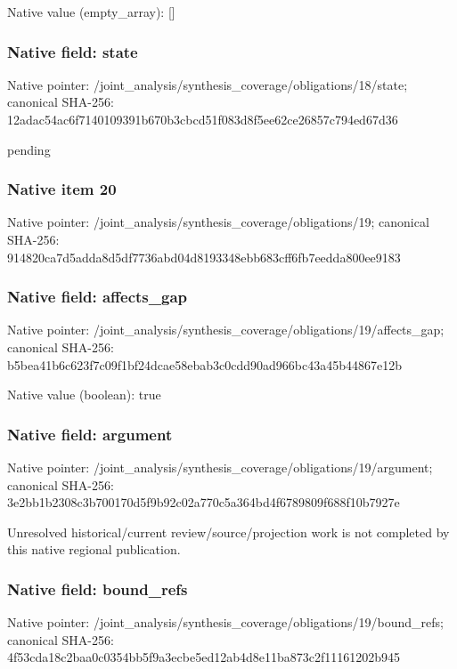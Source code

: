 \documentclass[10pt,a4paper]{article}
\begin{document}
Native value (empty\_\allowbreak{}array): []

\subsubsection{Native field: state}
Native pointer: /joint\_\allowbreak{}analysis/synthesis\_\allowbreak{}coverage/obligations/18/state; canonical SHA-256: 12adac54ac6f7140109391b670b3cbcd51f083d8f5ee62ce26857c794ed67d36

\begingroup\raggedright\sloppy pending\par\endgroup

\subsubsection{Native item 20}
Native pointer: /joint\_\allowbreak{}analysis/synthesis\_\allowbreak{}coverage/obligations/19; canonical SHA-256: 914820ca7d5adda8d5df7736abd04d8193348ebb683cff6fb7eedda800ee9183

\subsubsection{Native field: affects\_\allowbreak{}gap}
Native pointer: /joint\_\allowbreak{}analysis/synthesis\_\allowbreak{}coverage/obligations/19/affects\_\allowbreak{}gap; canonical SHA-256: b5bea41b6c623f7c09f1bf24dcae58ebab3c0cdd90ad966bc43a45b44867e12b

Native value (boolean): true

\subsubsection{Native field: argument}
Native pointer: /joint\_\allowbreak{}analysis/synthesis\_\allowbreak{}coverage/obligations/19/argument; canonical SHA-256: 3e2bb1b2308c3b700170d5f9b92c02a770c5a364bd4f6789809f688f10b7927e

\begingroup\raggedright\sloppy Unresolved historical/\allowbreak{}current review/\allowbreak{}source/\allowbreak{}projection work is not completed by this native regional publication.\par\endgroup

\subsubsection{Native field: bound\_\allowbreak{}refs}
Native pointer: /joint\_\allowbreak{}analysis/synthesis\_\allowbreak{}coverage/obligations/19/bound\_\allowbreak{}refs; canonical SHA-256: 4f53cda18c2baa0c0354bb5f9a3ecbe5ed12ab4d8e11ba873c2f11161202b945
\end{document}
